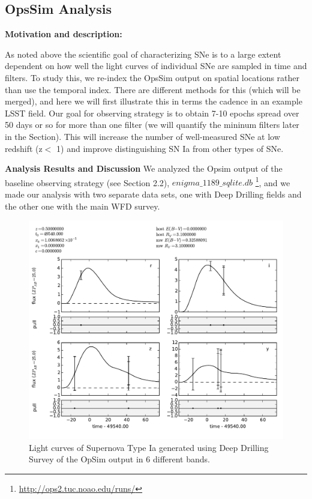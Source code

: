 
\subsection{OpsSim Analysis}
\label{sec:keyword:analysis}

{\bf Motivation and description:}

As noted above the scientific goal of characterizing SNe is to a large extent
dependent on how well the light curves of individual SNe are sampled in
time and filters. To study this, we re-index the OpsSim output on spatial
locations rather than use the temporal index. There are different methods for this (which will be merged), and here we will first illustrate this in terms the cadence in an example LSST field.
Our goal for observing strategy is to obtain 7-10 epochs spread over 50 days or so for more than one filter (we will quantify the mininum filters later in the Section). This will increase the number of well-measured SNe at low redshift (z$<$ 1) and improve distinguishing SN Ia from other types of SNe.

{\bf Analysis Results and Discussion}
We analyzed the Opsim output of the baseline observing strategy (see Section 2.2),
$enigma\_1189\_sqlite.db$ {\footnote {\url{http://ops2.tuc.noao.edu/runs/}}}, and 
we made our analysis with two separate data sets, one with Deep Drilling fields and the other one with the main WFD survey.

\begin{figure}[tbh!]
\includegraphics[angle=0,width=0.99\hsize:,clip]{figs/SN_309_lc.pdf}
\caption{Light curves of Supernova Type Ia generated using Deep Drilling Survey of the OpSim output in 6 different bands.
}
\label{fig:SNIaLCopsimdeep}
\end{figure}



